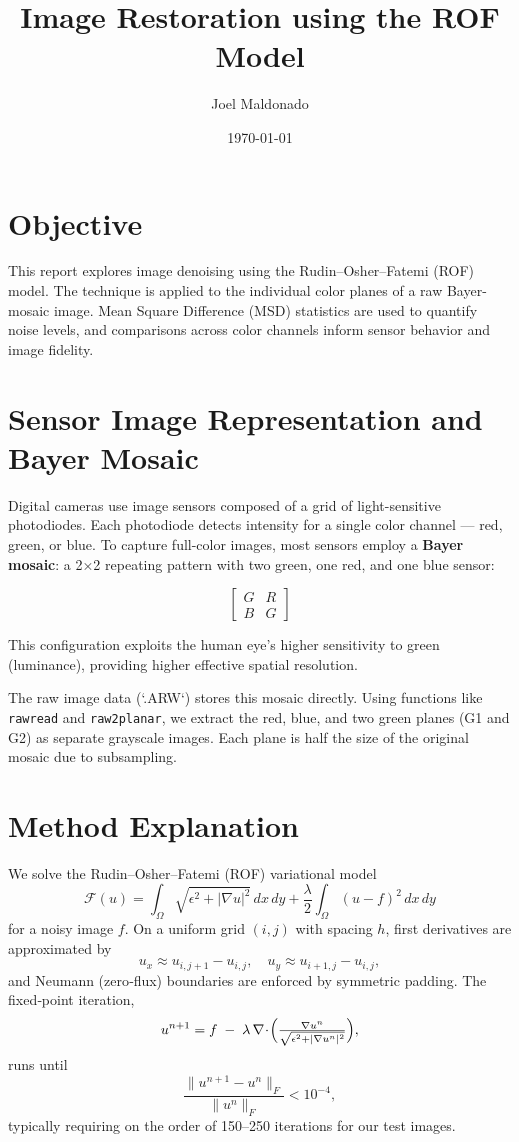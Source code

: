 \documentclass[11pt]{article}
\title{Image Restoration using the ROF Model}
\author{Joel Maldonado}
\date{\today}
\begin{document}
\maketitle

\section*{Objective}
This report explores image denoising using the Rudin–Osher–Fatemi (ROF) model. The technique is applied to the individual color planes of a raw Bayer-mosaic image. Mean Square Difference (MSD) statistics are used to quantify noise levels, and comparisons across color channels inform sensor behavior and image fidelity.

\section*{Sensor Image Representation and Bayer Mosaic}
Digital cameras use image sensors composed of a grid of light-sensitive photodiodes. Each photodiode detects intensity for a single color channel — red, green, or blue. To capture full-color images, most sensors employ a \textbf{Bayer mosaic}: a 2×2 repeating pattern with two green, one red, and one blue sensor:

\[
\begin{bmatrix}
G & R \\
B & G
\end{bmatrix}
\]

This configuration exploits the human eye's higher sensitivity to green (luminance), providing higher effective spatial resolution.

The raw image data (`.ARW`) stores this mosaic directly. Using functions like \texttt{rawread} and \texttt{raw2planar}, we extract the red, blue, and two green planes (G1 and G2) as separate grayscale images. Each plane is half the size of the original mosaic due to subsampling.


\section*{Method Explanation}
We solve the Rudin–Osher–Fatemi (ROF) variational model
\begin{equation}
\mathcal{F}(u)
= \int_\Omega \sqrt{\epsilon^2 + |\nabla u|^2}\,dx\,dy
+ \frac{\lambda}{2} \int_\Omega (u - f)^2\,dx\,dy
\label{eq:rof}
\end{equation}
for a noisy image \(f\).  On a uniform grid \((i,j)\) with spacing \(h\),
first derivatives are approximated by
\[
u_x \approx u_{i,j+1}-u_{i,j},\quad
u_y \approx u_{i+1,j}-u_{i,j},
\]
and Neumann (zero‐flux) boundaries are enforced by symmetric padding.  The fixed‐point iteration,
\begin{equation}
u^{n+1}
= f \;-\;\lambda\,\nabla\!\cdot\!\Bigl(\tfrac{\nabla u^n}{\sqrt{\epsilon^2 + |\nabla u^n|^2}}\Bigr),
\label{eq:update}
\end{equation}
runs until
\[
\frac{\|u^{n+1}-u^n\|_F}{\|u^n\|_F} < 10^{-4},
\]
typically requiring on the order of 150–250 iterations for our test images.
\end{document}
